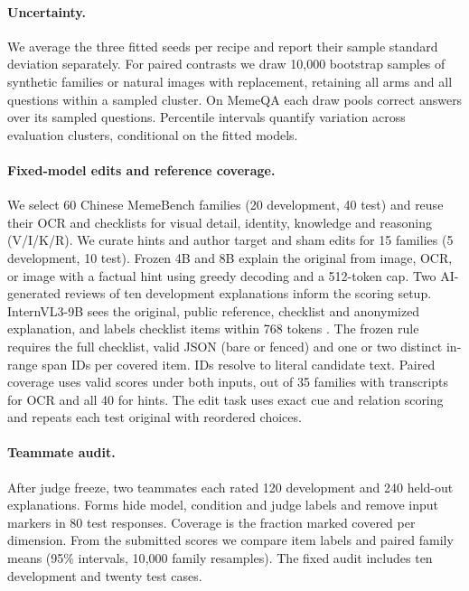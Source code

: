 \documentclass[11pt]{article}
\begin{document}
\paragraph{Uncertainty.}
We average the three fitted seeds per recipe and report their sample standard deviation separately. For paired contrasts we draw 10{,}000 bootstrap samples of synthetic families or natural images with replacement, retaining all arms and all questions within a sampled cluster. On MemeQA each draw pools correct answers over its sampled questions. Percentile intervals quantify variation across evaluation clusters, conditional on the fitted models.

\paragraph{Fixed-model edits and reference coverage.}
We select 60 Chinese MemeBench families (20 development, 40 test) and reuse their OCR and checklists for visual detail, identity, knowledge and reasoning (V/I/K/R). We curate hints and author target and sham edits for 15 families (5 development, 10 test). Frozen 4B and 8B explain the original from image, OCR, or image with a factual hint using greedy decoding and a 512-token cap. Two AI-generated reviews of ten development explanations inform the scoring setup. InternVL3-9B sees the original, public reference, checklist and anonymized explanation, and labels checklist items within 768 tokens \citep{opengvlab2025internvl3}. The frozen rule requires the full checklist, valid JSON (bare or fenced) and one or two distinct in-range span IDs per covered item. IDs resolve to literal candidate text. Paired coverage uses valid scores under both inputs, out of 35 families with transcripts for OCR and all 40 for hints. The edit task uses exact cue and relation scoring and repeats each test original with reordered choices.



\paragraph{Teammate audit.}
After judge freeze, two teammates each rated 120 development and 240 held-out explanations. Forms hide model, condition and judge labels and remove input markers in 80 test responses. Coverage is the fraction marked covered per dimension. From the submitted scores we compare item labels and paired family means (95\% intervals, 10{,}000 family resamples). The fixed audit includes ten development and twenty test cases.
\end{document}
